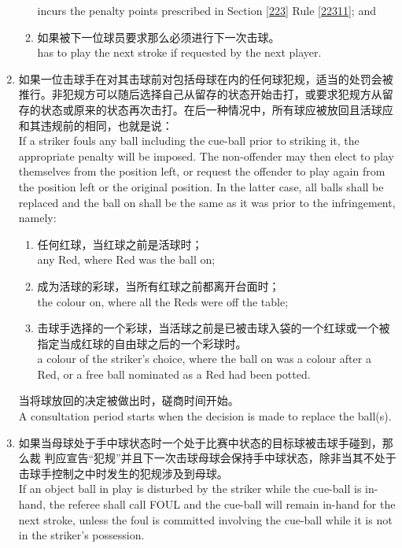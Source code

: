 \begin{enumerate}[label=(\alph*)]
\begin{enumerate}[label=(\roman*)]
        incurs the penalty points prescribed in Section \ref{223} Rule \ref{22311}; and 
        \item 如果被下一位球员要求那么必须进行下一次击球。\\
        has to play the next stroke if requested by the next player.
    \end{enumerate}
    \item \label{22310i}如果一位击球手在对其击球前对包括母球在内的任何球犯规，适当的处罚会被推行。非犯规方可以随后选择自己从留存的状态开始击打，或要求犯规方从留存的状态或原来的状态再次击打。在后一种情况中，所有球应被放回且活球应和其违规前的相同，也就是说：\\
    If a striker fouls any ball including the cue-ball prior to striking it, the appropriate penalty will be imposed. The non-offender may then elect to play themselves from the position left, or request the offender to play again from the position left or the original position. In the latter case, all balls shall be replaced and the ball on shall be the same as it was prior to the infringement, namely:
    \begin{enumerate}[label=(\roman*)]
        \item 任何红球，当红球之前是活球时；\\
        any Red, where Red was the ball on;
        \item 成为活球的彩球，当所有红球之前都离开台面时；\\
        the colour on, where all the Reds were off the table;
        \item 击球手选择的一个彩球，当活球之前是已被击球入袋的一个红球或一个被指定当成红球的自由球之后的一个彩球时。\\
        a colour of the striker's choice, where the ball on was a colour after a Red, or a free ball nominated as a Red had been potted.
    \end{enumerate}
    当将球放回的决定被做出时，磋商时间开始。\\
    A consultation period starts when the decision is made to replace the ball(s).
    \item 如果当母球处于手中球状态时一个处于比赛中状态的目标球被击球手碰到，那么裁
    判应宣告``犯规''并且下一次击球母球会保持手中球状态，除非当其不处于击球手控制之中时发生的犯规涉及到母球。\\
    If an object ball in play is disturbed by the striker while the cue-ball is in-hand, the referee shall call FOUL and the cue-ball will remain in-hand for the next stroke, unless the foul is committed involving the cue-ball while it is not in the striker's possession.
\end{enumerate}

